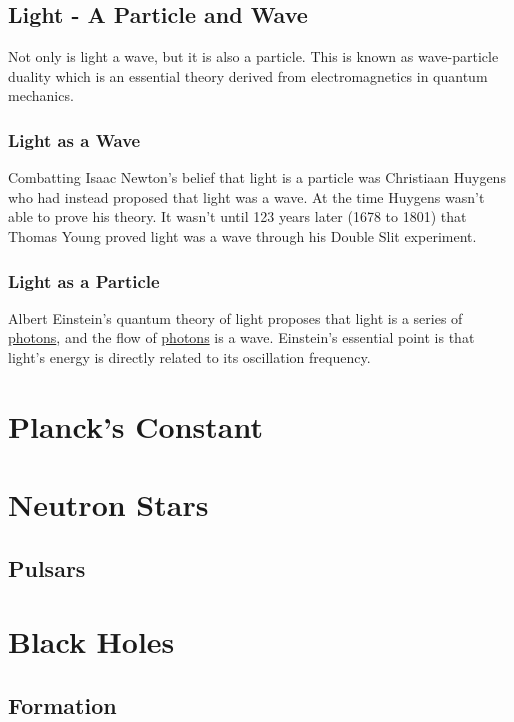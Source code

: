 \documentclass{article}
\begin{document}
\subsection{Light - A Particle and Wave}
Not only is light a wave, but it is also a particle. This is known as wave-particle duality which is an essential theory derived from electromagnetics in quantum mechanics.

\subsubsection{Light as a Wave}
Combatting Isaac Newton's belief that light is a particle was Christiaan Huygens who had instead proposed that light was a wave. At the time Huygens wasn't able to prove his theory. It wasn't until 123 years later (1678 to 1801) that Thomas Young proved light was a wave through his Double Slit experiment.

\subsubsection{Light as a Particle}
Albert Einstein's quantum theory of light proposes that light is a series of \hyperref[sec:photons]{photons}, and the flow of \hyperref[sec:photons]{photons} is a wave. Einstein's essential point is that light's energy is directly related to its oscillation frequency.



\section{Planck's Constant}




\section{Neutron Stars}

\subsection{Pulsars}




\section{Black Holes}
\subsection{Formation}
\end{document}
